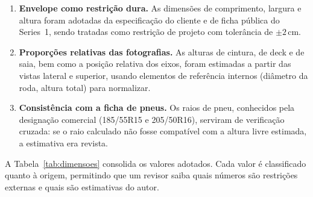 \begin{enumerate}[label=\arabic*),leftmargin=1.4cm]
  \item \textbf{Envelope como restri{\c{c}}\~ao dura.} As dimens\~oes de comprimento, largura e
        altura foram adotadas da especifica{\c{c}}\~ao do cliente e de ficha p\'ublica do
        Series~1, sendo tratadas como restri{\c{c}}\~ao de projeto com toler\^ancia de
        $\pm2$\,cm.
  \item \textbf{Propor{\c{c}}\~oes relativas das fotografias.} As alturas de cintura, de deck e
        de saia, bem como a posi{\c{c}}\~ao relativa dos eixos, foram estimadas a partir das
        vistas lateral e superior, usando elementos de refer\^encia internos (di\^ametro da roda,
        altura total) para normalizar.
  \item \textbf{Consist\^encia com a ficha de pneus.} Os raios de pneu, conhecidos pela
        designa{\c{c}}\~ao comercial (185/55R15 e 205/50R16), serviram de verifica{\c{c}}\~ao
        cruzada: se o raio calculado n\~ao fosse compat\'ivel com a altura livre estimada, a
        estimativa era revista.
\end{enumerate}

A Tabela~\ref{tab:dimensoes} consolida os valores adotados. Cada valor \'e classificado quanto
\`a origem, permitindo que um revisor saiba quais n\'umeros s\~ao restri{\c{c}}\~oes externas e
quais s\~ao estimativas do autor.

